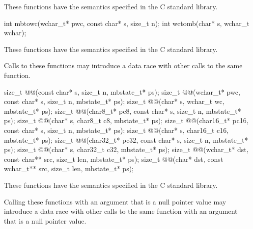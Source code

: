 \begin{itemdescr}
\pnum
\effects
These functions have the semantics specified in the C standard library.
\end{itemdescr}


%
%
\begin{itemdecl}
int mbtowc(wchar_t* pwc, const char* s, size_t n);
int wctomb(char* s, wchar_t wchar);
\end{itemdecl}

\begin{itemdescr}
\pnum
\effects
These functions have the semantics specified in the C standard library.

\pnum
\remarks
Calls to these functions
may introduce a data race
with other calls to the same function.
\end{itemdescr}


\begin{itemdecl}
size_t @@(const char* s, size_t n, mbstate_t* ps);
size_t @@(wchar_t* pwc, const char* s, size_t n, mbstate_t* ps);
size_t @@(char* s, wchar_t wc, mbstate_t* ps);
size_t @@(char8_t* pc8, const char* s, size_t n, mbstate_t* ps);
size_t @@(char* s, char8_t c8, mbstate_t* ps);
size_t @@(char16_t* pc16, const char* s, size_t n, mbstate_t* ps);
size_t @@(char* s, char16_t c16, mbstate_t* ps);
size_t @@(char32_t* pc32, const char* s, size_t n, mbstate_t* ps);
size_t @@(char* s, char32_t c32, mbstate_t* ps);
size_t @@(wchar_t* dst, const char** src, size_t len, mbstate_t* ps);
size_t @@(char* dst, const wchar_t** src, size_t len, mbstate_t* ps);
\end{itemdecl}

\begin{itemdescr}
\pnum
\effects
These functions have the semantics specified in the C standard library.

\pnum
\remarks
Calling these functions
with an  argument that is a null pointer value
may introduce a data race
with other calls to the same function
with an  argument that is a null pointer value.
\end{itemdescr}

